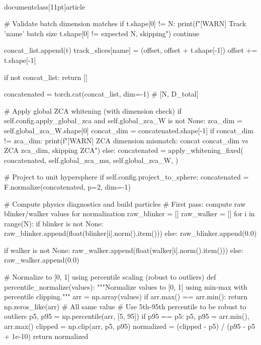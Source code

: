\\documentclass[11pt]{article}
\begin{document}
\begin{CodeBlock}
                # Validate batch dimension matches
                if t.shape[0] != N:
                    print(f"[WARN] Track '{name}' batch size {t.shape[0]} != expected {N}, skipping")
                    continue

                concat_list.append(t)
                track_slices[name] = (offset, offset + t.shape[-1])
                offset += t.shape[-1]

        if not concat_list:
            return []

        concatenated = torch.cat(concat_list, dim=-1)  # [N, D_total]

        # Apply global ZCA whitening (with dimension check)
        if self.config.apply_global_zca and self.global_zca_W is not None:
            zca_dim = self.global_zca_W.shape[0]
            concat_dim = concatenated.shape[-1]
            if concat_dim != zca_dim:
                print(f"[WARN] ZCA dimension mismatch: concat {concat_dim} vs ZCA {zca_dim}, skipping ZCA")
            else:
                concatenated = apply_whitening_fixed(
                    concatenated,
                    self.global_zca_mu,
                    self.global_zca_W,
                )

        # Project to unit hypersphere
        if self.config.project_to_sphere:
            concatenated = F.normalize(concatenated, p=2, dim=-1)

        # Compute physics diagnostics and build particles
        # First pass: compute raw blinker/walker values for normalization
        raw_blinker = []
        raw_walker = []
        for i in range(N):
            if blinker is not None:
                raw_blinker.append(float(blinker[i].norm().item()))
            else:
                raw_blinker.append(0.0)

            if walker is not None:
                raw_walker.append(float(walker[i].norm().item()))
            else:
                raw_walker.append(0.0)

        # Normalize to [0, 1] using percentile scaling (robust to outliers)
        def percentile_normalize(values):
            """Normalize values to [0, 1] using min-max with percentile clipping."""
            arr = np.array(values)
            if arr.max() == arr.min():
                return np.zeros_like(arr)  # All same value
            # Use 5th-95th percentile to be robust to outliers
            p5, p95 = np.percentile(arr, [5, 95])
            if p95 == p5:
                p5, p95 = arr.min(), arr.max()
            clipped = np.clip(arr, p5, p95)
            normalized = (clipped - p5) / (p95 - p5 + 1e-10)
            return normalized


\end{CodeBlock}
\end{document}
